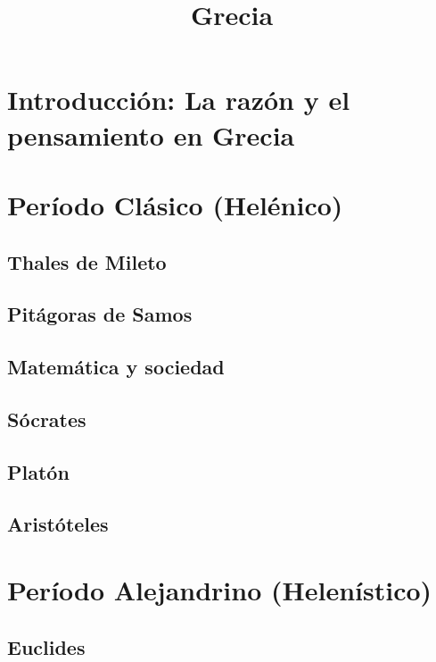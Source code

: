 \documentclass[a4paper,12pt,openany]{article}
\begin{document}
\title{\vspace{-2cm}Grecia}
\date{}
\maketitle

\section{Introducción: La razón y el pensamiento en Grecia}


\section{Período Clásico (Helénico)}


\subsection{Thales de Mileto}


\subsection{Pitágoras de Samos}


\subsection{Matemática y sociedad}


\subsection{Sócrates}


\subsection{Platón}


\subsection{Aristóteles}


\section{Período Alejandrino (Helenístico)}


\subsection{Euclides}

\end{document}
